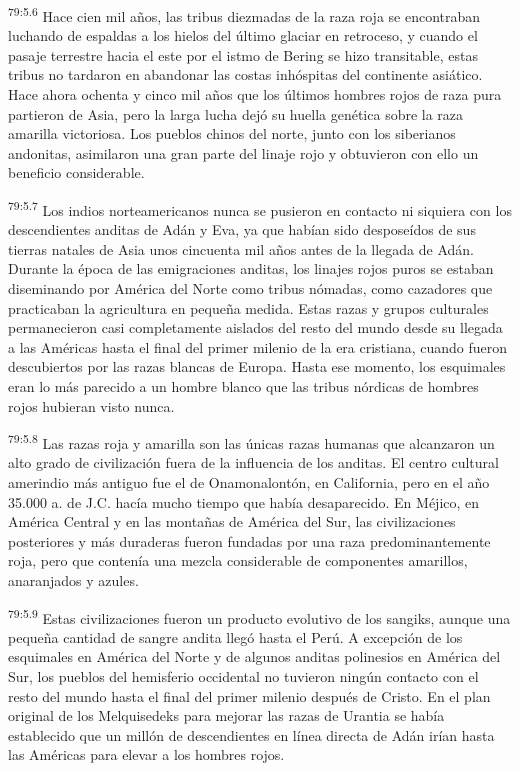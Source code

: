 \par
\textsuperscript{79:5.6} Hace cien mil años, las tribus diezmadas de la raza roja se encontraban luchando de espaldas a los hielos del último glaciar en retroceso, y cuando el pasaje terrestre hacia el este por el istmo de Bering se hizo transitable, estas tribus no tardaron en abandonar las costas inhóspitas del continente asiático. Hace ahora ochenta y cinco mil años que los últimos hombres rojos de raza pura partieron de Asia, pero la larga lucha dejó su huella genética sobre la raza amarilla victoriosa. Los pueblos chinos del norte, junto con los siberianos andonitas, asimilaron una gran parte del linaje rojo y obtuvieron con ello un beneficio considerable.

\par
\textsuperscript{79:5.7} Los indios norteamericanos nunca se pusieron en contacto ni siquiera con los descendientes anditas de Adán y Eva, ya que habían sido desposeídos de sus tierras natales de Asia unos cincuenta mil años antes de la llegada de Adán. Durante la época de las emigraciones anditas, los linajes rojos puros se estaban diseminando por América del Norte como tribus nómadas, como cazadores que practicaban la agricultura en pequeña medida. Estas razas y grupos culturales permanecieron casi completamente aislados del resto del mundo desde su llegada a las Américas hasta el final del primer milenio de la era cristiana, cuando fueron descubiertos por las razas blancas de Europa. Hasta ese momento, los esquimales eran lo más parecido a un hombre blanco que las tribus nórdicas de hombres rojos hubieran visto nunca.

\par
\textsuperscript{79:5.8} Las razas roja y amarilla son las únicas razas humanas que alcanzaron un alto grado de civilización fuera de la influencia de los anditas. El centro cultural amerindio más antiguo fue el de Onamonalontón, en California, pero en el año 35.000 a. de J.C. hacía mucho tiempo que había desaparecido. En Méjico, en América Central y en las montañas de América del Sur, las civilizaciones posteriores y más duraderas fueron fundadas por una raza predominantemente roja, pero que contenía una mezcla considerable de componentes amarillos, anaranjados y azules.

\par
\textsuperscript{79:5.9} Estas civilizaciones fueron un producto evolutivo de los sangiks, aunque una pequeña cantidad de sangre andita llegó hasta el Perú. A excepción de los esquimales en América del Norte y de algunos anditas polinesios en América del Sur, los pueblos del hemisferio occidental no tuvieron ningún contacto con el resto del mundo hasta el final del primer milenio después de Cristo. En el plan original de los Melquisedeks para mejorar las razas de Urantia se había establecido que un millón de descendientes en línea directa de Adán irían hasta las Américas para elevar a los hombres rojos.

